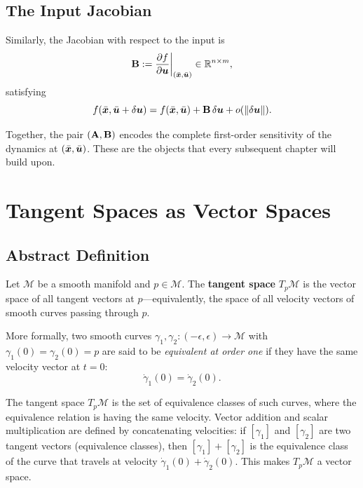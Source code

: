 \subsection{The Input Jacobian}

Similarly, the Jacobian with respect to the input is
\begin{equation}
\mathbf{B} := \frac{\partial f}{\partial \bm{u}}\bigg|_{(\bar{\bm{x}},\bar{\bm{u}})} \in \mathbb{R}^{n\times m},
\label{eq:ch1:jacobian-B}
\end{equation}
satisfying
\begin{equation}
f(\bar{\bm{x}}, \bar{\bm{u}} + \delta\bm{u})
= f(\bar{\bm{x}}, \bar{\bm{u}}) + \mathbf{B}\,\delta\bm{u} + o(\left\lVert \delta\bm{u} \right\rVert).
\label{eq:ch1:frechet-u}
\end{equation}

Together, the pair $(\mathbf{A}, \mathbf{B})$ encodes the complete first-order
sensitivity of the dynamics at $(\bar{\bm{x}}, \bar{\bm{u}})$. These are the objects that every
subsequent chapter will build upon.


\section{Tangent Spaces as Vector Spaces}

\subsection{Abstract Definition}

\begin{definition}\label{def:tangent-space}
Let $\mathcal{M}$ be a smooth manifold and $p\in\mathcal{M}$. The \textbf{tangent space}
$T_p\mathcal{M}$ is the vector space of all tangent vectors at $p$---equivalently, the
space of all velocity vectors of smooth curves passing through $p$.
\end{definition}

More formally, two smooth curves $\gamma_1, \gamma_2: (-\epsilon, \epsilon) \to \mathcal{M}$
with $\gamma_1(0) = \gamma_2(0) = p$ are said to be \emph{equivalent at order one} if
they have the same velocity vector at $t=0$:
\begin{equation}
\dot{\gamma}_1(0) = \dot{\gamma}_2(0).
\label{eq:ch1:curve-equivalence}
\end{equation}

The tangent space $T_p\mathcal{M}$ is the set of equivalence classes of such curves, where
the equivalence relation is having the same velocity. Vector addition and scalar multiplication
are defined by concatenating velocities: if $[\gamma_1]$ and $[\gamma_2]$ are two tangent
vectors (equivalence classes), then $[\gamma_1] + [\gamma_2]$ is the equivalence class of
the curve that travels at velocity $\dot{\gamma}_1(0) + \dot{\gamma}_2(0)$. This makes
$T_p\mathcal{M}$ a vector space.

